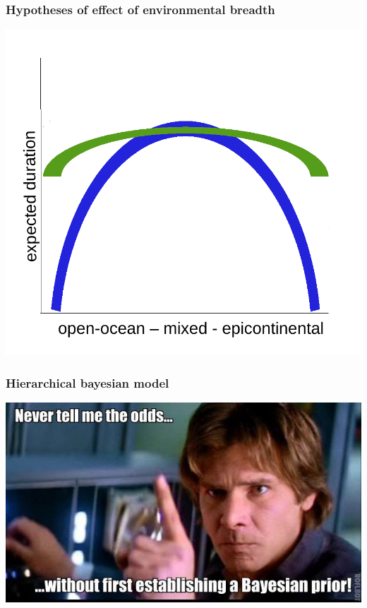\documentclass{beamer}
\begin{document}
\begin{frame}
  \frametitle{Hypotheses of effect of environmental breadth}

  \begin{center}
    \includegraphics[width = \textwidth,height = 0.8\textheight,keepaspectratio = true]{figure/selection_breadth}
  \end{center}
\end{frame}

\begin{frame}
  \frametitle{Hierarchical bayesian model}
  \begin{center}
    \includegraphics[width = \textwidth,height = 0.8\textheight,keepaspectratio = true]{figure/han_bayes}
  \end{center}
\end{frame}
\end{document}
